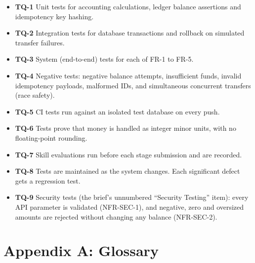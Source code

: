 \documentclass[11pt,a4paper]{article}
\providecommand{\tightlist}{\setlength{\itemsep}{2pt}\setlength{\parskip}{0pt}}
\begin{document}
\begin{itemize}
\tightlist
\item
  \textbf{TQ-1} Unit tests for accounting calculations, ledger balance assertions and idempotency key
  hashing.
\item
  \textbf{TQ-2} Integration tests for database transactions and rollback on simulated transfer failures.
\item
  \textbf{TQ-3} System (end-to-end) tests for each of FR-1 to FR-5.
\item
  \textbf{TQ-4} Negative tests: negative balance attempts, insufficient funds, invalid idempotency
  payloads, malformed IDs, and simultaneous concurrent transfers (race safety).
\item
  \textbf{TQ-5} CI tests run against an isolated test database on every push.
\item
  \textbf{TQ-6} Tests prove that money is handled as integer minor units, with no floating-point
  rounding.
\item
  \textbf{TQ-7} Skill evaluations run before each stage submission and are recorded.
\item
  \textbf{TQ-8} Tests are maintained as the system changes. Each significant defect gets a regression
  test.
\item
  \textbf{TQ-9} Security tests (the brief's unnumbered ``Security Testing'' item): every API parameter is
  validated (NFR-SEC-1), and negative, zero and oversized amounts are rejected without changing any
  balance (NFR-SEC-2).
\end{itemize}

\section{Appendix A: Glossary}\label{appendix-a-glossary}
\end{document}
